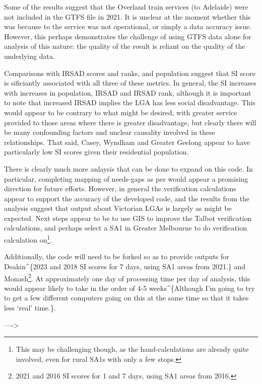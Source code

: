 \documentclass[]{tufte-book}
\begin{document}
Some of the results suggest that the Overland train services (to
Adelaide) were not included in the GTFS file in 2021. It is unclear at
the moment whether this was because to the service was not operational,
or simply a data accuracy issue. However, this perhaps demonstrates the
challenge of using GTFS data alone for analysis of this nature: the
quality of the result is reliant on the quality of the underlying data.

Comparisons with IRSAD scores and ranks, and population suggest that SI
score is sificiantly associated with all three of these metrics. In
general, the SI increases with increases in population, IRSAD and IRSAD
rank, although it is important to note that increased IRSAD implies the
LGA has less social disadvantage. This would appear to be contrary to
what might be desired, with greater service provided to those areas
where there is greater disadvantage, but clearly there will be many
confounding factors and unclear causality involved in these
relationships. That said, Casey, Wyndham and Greater Geelong appear to
have particularly low SI scores given their residential population.

There is clearly much more anlaysis that can be done to expand on this
code. In particular, completing mapping of needs-gaps as per
\citet{currie2007identifying} would appear a promising direction for
future efforts. However, in general the verification calculations appear
to support the accuracy of the developed code, and the results from the
analysis suggest that output about Victorian LGAs is largely as might be
expected. Next steps appear to be to use GIS to improve the Talbot
verification calculations, and perhaps select a SA1 in Greater Melbourne
to do verification calculation on\footnote{This may be challenging
  though, as the hand-calculations are already quite involved, even for
  rural SA1s with only a few stops.}.

Additionally, the code will need to be forked so as to provide outputs
for Deakin\^{}\{2023 and 2018 SI scores for 7 days, using SA1 areas from
2021.\} and Monash\footnote{2021 and 2016 SI scores for 1 and 7 days,
  using SA1 areas from 2016.}. At approximately one day of processing
time per day of analysis, this would appear likely to take in the order
of 4-5 weeks\^{}\{Although I'm going to try to get a few different
computers going on this at the same time so that it takes less `real'
time.\}.

----\textgreater{}

\renewcommand\refname{References}

\end{document}
